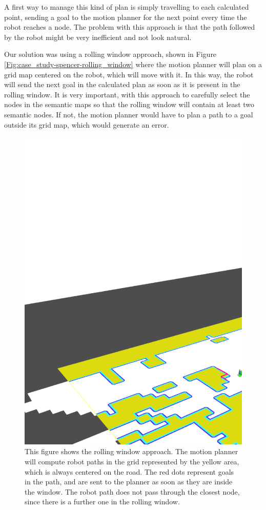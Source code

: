 A first way to manage this kind of plan is simply travelling to each calculated point, sending a goal to the motion planner for the next point every time the robot reaches a node. The problem with this approach is that the path followed by the robot might be very inefficient and not look natural.

Our solution was using a rolling window approach, shown in Figure \ref{Fig:case_study-spencer-rolling_window} where the motion planner will plan on a grid map centered on the robot, which will move with it. In this way, the robot will send the next goal in the calculated plan as soon as it is present in the rolling window. It is very important, with this approach to carefully select the nodes in the semantic maps so that the rolling window will contain at least two semantic nodes. If not, the motion planner would have to plan a path to a goal outside its grid map, which would generate an error.


\begin{figure}[ht!]
	\centering
	\includegraphics[scale=0.45]{img/case_study/spencer/rolling_window.pdf}
	\caption{This figure shows the rolling window approach. The motion planner will compute robot paths in the grid represented by the yellow area, which is always centered on the road. The red dots represent goals in the path, and are sent to the planner as soon as they are inside the window. The robot path does not pass through the closest node, since there is a further one in the rolling window.}
	\label{fig:case_study-spencer-team}
\end{figure}



